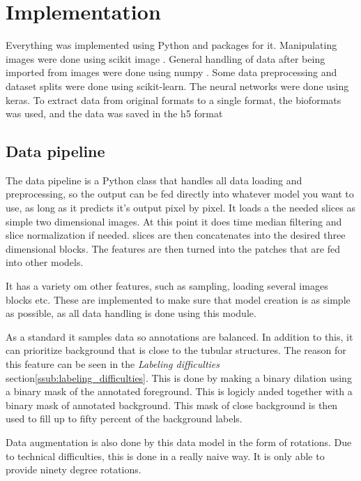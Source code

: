 \section{Implementation} %
\label{sec:implementation}
Everything was implemented using Python\cite{python} and packages for it.
Manipulating images were done using scikit image \cite{scikit-image}.
General handling of data after being imported from images were done using numpy \cite{numpy}.
Some data preprocessing and dataset splits were done using scikit-learn\cite{scikit-learn}.
The neural networks were done using keras\cite{keras}.
To extract data from original formats to a single format, the bioformats\cite{bioformats} was used, and the data was saved in the h5 format\cite{hdf5}

\subsection{Data pipeline} %
\label{sub:data_pipeline}
The data pipeline is a Python class that handles all data loading and preprocessing, so the output can be fed directly into whatever model you want to use, as long as it predicts it's output pixel by pixel.
It loads a the needed slices as simple two dimensional images.
At this point it does time median filtering and slice normalization if needed.
slices are then concatenates into the desired three dimensional blocks.
The features are then turned into the patches that are fed into other models.

It has a variety om other features, such as sampling, loading several images blocks etc.
These are implemented to make sure that model creation is as simple as possible, as all data handling is done using this module.

As a standard it samples data so annotations are balanced.
In addition to this, it can prioritize background that is close to the tubular structures.
The reason for this feature can be seen in the \textit{Labeling difficulties} section\ref{ssub:labeling_difficulties}.
This is done by making a binary dilation using a binary mask of the annotated foreground.
This is logicly anded together with a binary mask of annotated background.
This mask of close background is then used to fill up to fifty percent of the background labels.

Data augmentation is also done by this data model in the form of rotations.
Due to technical difficulties, this is done in a really naive way.
It is only able to provide ninety degree rotations.

